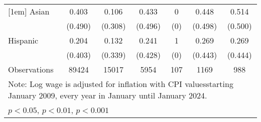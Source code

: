 \begin{table}[htbp]
\begin{tabular}{l*{6}{c}}
[1em]
Asian               &       0.403         &       0.106         &       0.433         &           0         &       0.448         &       0.514         \\
                    &     (0.490)         &     (0.308)         &     (0.496)         &         (0)         &     (0.498)         &     (0.500)         \\
[1em]
Hispanic            &       0.204         &       0.132         &       0.241         &           1         &       0.269         &       0.269         \\
                    &     (0.403)         &     (0.339)         &     (0.428)         &         (0)         &     (0.443)         &     (0.444)         \\
\hline
Observations        &       89424         &       15017         &        5954         &         107         &        1169         &         988         \\
\hline\hline
\multicolumn{7}{l}{\footnotesize Note: Log wage is adjusted for inflation with CPI valuesstarting January 2009, every year in January until January 2024.}\\
\multicolumn{7}{l}{\footnotesize \sym{*} \(p<0.05\), \sym{**} \(p<0.01\), \sym{***} \(p<0.001\)}\\
\end{tabular}
\end{table}
